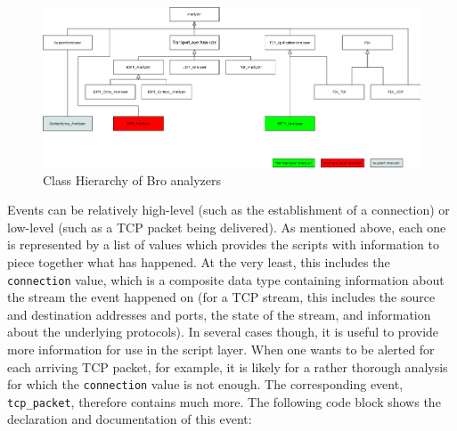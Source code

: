 \begin{figure}[!t]
\centering
\includegraphics[width=\columnwidth]{Figures/als.png}
\caption{Class Hierarchy of Bro analyzers}
\label{pic:als}
\end{figure}


Events can be relatively high-level (such as the establishment of a connection) or low-level (such as a TCP packet being delivered). As mentioned above, each one is represented by a list of values which provides the scripts with information to piece together what has happened. At the very least, this includes the \texttt{connection} value, which is a composite data type containing information about the stream the event happened on (for a TCP stream, this includes the source and destination addresses and ports, the state of the stream, and information about the underlying protocols). In several cases though, it is useful to provide more information for use in the script layer. When one wants to be alerted for each arriving TCP packet, for example, it is likely for a rather thorough analysis for which the \texttt{connection} value is not enough. The corresponding event, \texttt{tcp\_packet}, therefore contains much more. The following code block shows the declaration and documentation of this event: \\ \\

